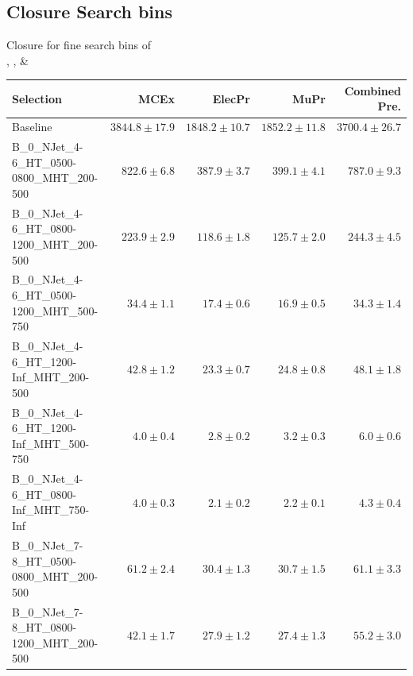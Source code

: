 \documentclass{beamer}
\begin{document}
\subsection{Closure Search bins}
\begin{frame}
 \begin{center}
    {\Large Closure for fine search bins of\\ \HT, \MHT, \NJets \& \BTags}
  \end{center}
\end{frame}
\begin{frame}
\tiny
\begin{tabular}{lrrrr}
\toprule

                                                Selection  &                     MCEx  &           ElecPr  &             MuPr  &          Combined Pre.  \\ 
\midrule
                                         Baseline &           $3844.8\pm17.9$&           $1848.2\pm10.7$&           $1852.2\pm11.8$&               $3700.4\pm26.7$ \\ 
     B\_0\_NJet\_4-6\_HT\_0500-0800\_MHT\_200-500 &             $822.6\pm6.8$&             $387.9\pm3.7$&             $399.1\pm4.1$&                 $787.0\pm9.3$ \\ 
     B\_0\_NJet\_4-6\_HT\_0800-1200\_MHT\_200-500 &             $223.9\pm2.9$&             $118.6\pm1.8$&             $125.7\pm2.0$&                 $244.3\pm4.5$ \\ 
     B\_0\_NJet\_4-6\_HT\_0500-1200\_MHT\_500-750 &              $34.4\pm1.1$&              $17.4\pm0.6$&              $16.9\pm0.5$&                  $34.3\pm1.4$ \\ 
      B\_0\_NJet\_4-6\_HT\_1200-Inf\_MHT\_200-500 &              $42.8\pm1.2$&              $23.3\pm0.7$&              $24.8\pm0.8$&                  $48.1\pm1.8$ \\ 
      B\_0\_NJet\_4-6\_HT\_1200-Inf\_MHT\_500-750 &               $4.0\pm0.4$&               $2.8\pm0.2$&               $3.2\pm0.3$&                   $6.0\pm0.6$ \\ 
      B\_0\_NJet\_4-6\_HT\_0800-Inf\_MHT\_750-Inf &               $4.0\pm0.3$&               $2.1\pm0.2$&               $2.2\pm0.1$&                   $4.3\pm0.4$ \\ 
     B\_0\_NJet\_7-8\_HT\_0500-0800\_MHT\_200-500 &              $61.2\pm2.4$&              $30.4\pm1.3$&              $30.7\pm1.5$&                  $61.1\pm3.3$ \\ 
     B\_0\_NJet\_7-8\_HT\_0800-1200\_MHT\_200-500 &              $42.1\pm1.7$&              $27.9\pm1.2$&              $27.4\pm1.3$&                  $55.2\pm3.0$ \\ 

\end{tabular}
\end{frame}
\end{document}
